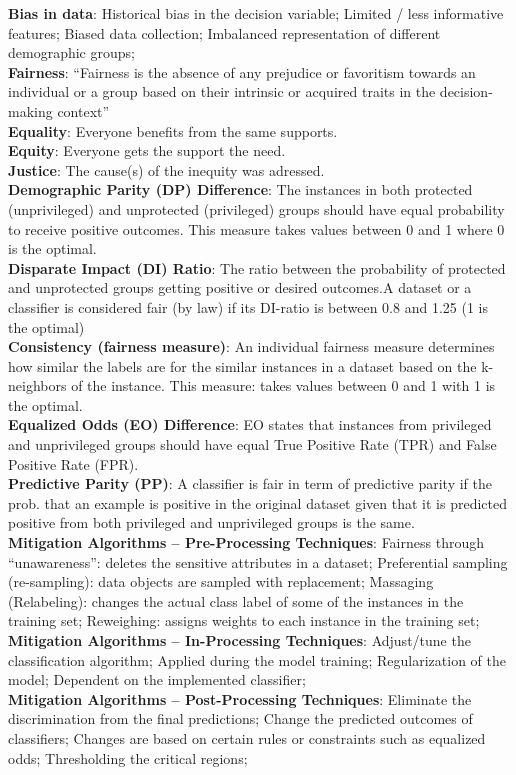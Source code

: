 \documentclass[a4paper,7pt,landscape]{extarticle}
\begin{document}
\begin{multicols}{3}
\begin{boxA}
\textbf{Bias in data}: Historical bias in the decision variable; Limited / less informative features; Biased data collection; Imbalanced representation of different demographic groups;\\
\textbf{Fairness}: “Fairness is the absence of any prejudice or favoritism towards an individual or a group based on their intrinsic or acquired traits in the decision-making context”\\
\textbf{Equality}: Everyone benefits from the same supports.\\
\textbf{Equity}: Everyone gets the support the need.\\
\textbf{Justice}: The cause(s) of the inequity was adressed.\\
\textbf{Demographic Parity (DP) Difference}: The instances in both protected (unprivileged) and unprotected (privileged) groups should have equal probability to receive positive outcomes. This measure takes values between 0 and 1 where 0 is the optimal.\\
\textbf{Disparate Impact (DI) Ratio}: The ratio between the probability of protected and unprotected groups getting positive or desired outcomes.A dataset or a classifier is considered fair (by law) if its DI-ratio is between 0.8 and 1.25 (1 is the optimal)\\
\textbf{Consistency (fairness measure)}: An individual fairness measure determines how similar the labels are for the similar instances in a dataset based on the k-neighbors of the instance. This measure: takes values between 0 and 1 with 1 is the optimal.\\
\textbf{Equalized Odds (EO) Difference}: EO states that instances from privileged and unprivileged groups should have equal True Positive Rate (TPR) and False Positive Rate (FPR).\\
\textbf{Predictive Parity (PP)}: A classifier is fair in term of predictive parity if the prob. that an example is positive in the original dataset given that it is predicted positive from both privileged and unprivileged groups is the same.\\
\textbf{Mitigation Algorithms – Pre-Processing Techniques}: Fairness through “unawareness”: deletes the sensitive attributes in a dataset; Preferential sampling (re-sampling): data objects are sampled with replacement; Massaging (Relabeling): changes the actual class label of some of the instances in the training set; Reweighing: assigns weights to each instance in the training set;\\
\textbf{Mitigation Algorithms – In-Processing Techniques}: Adjust/tune the classification algorithm; Applied during the model training; Regularization of the model; Dependent on the implemented classifier;\\
\textbf{Mitigation Algorithms – Post-Processing Techniques}: Eliminate the discrimination from the final predictions; Change the predicted outcomes of classifiers; Changes are based on certain rules or constraints such as equalized odds; Thresholding the critical regions;


\end{boxA}
\end{multicols}
\end{document}
